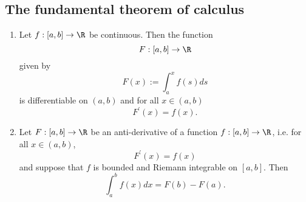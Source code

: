 \subsection{The fundamental theorem of calculus}
\begin{theorem}
    \begin{enumerate}[label=\roman*.]
        \item Let $f:[a,b] \to \R$ be continuous. Then the function
            $$F:[a,b] \to \R$$
            given by
            $$F(x) := \int_a^xf(s)ds$$
            is differentiable on $(a,b)$ and for all $x \in (a,b)$
            $$F^\prime(x) = f(x).$$
        \item Let $F:[a,b] \to \R$ be an anti-derivative of a function $f:[a,b] \to \R$,
            i.e. for all $x \in (a,b)$,
            $$F^\prime(x) = f(x)$$
            and suppose that $f$ is bounded and Riemann integrable on $[a,b]$.
            Then
            $$\int_a^bf(x)dx = F(b) - F(a).$$
    \end{enumerate}
\end{theorem}
